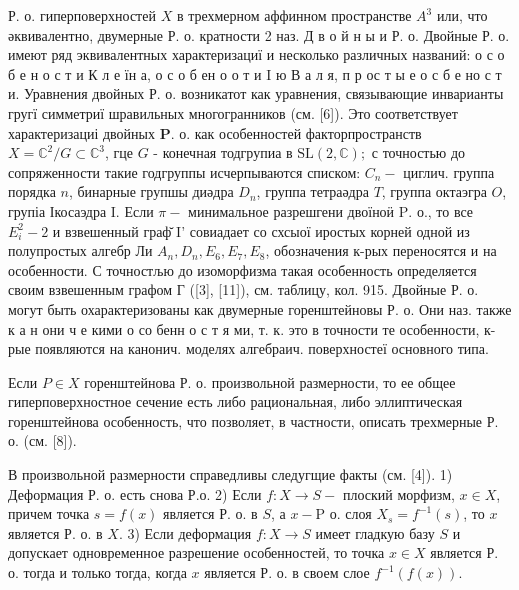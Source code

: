 \documentclass[10pt]{article}
\begin{document}
Р. о. гиперповерхностей $X$ в трехмерном аффинном пространстве $A^{3}$ или, что әквивалентно, двумерные Р. о. кратности 2 наз. Д в о й н ы и Р. о. Двойные Р. о. имеют ряд эквивалентных характеризациї и несколько различных названий: о с о б е н о с т и К л е їн а, о с о б ен о о т и I ю В а л я, п р ос т ы е о с б е но с т и. Уравнения двойных Р. о. возникатот как уравнения, связывающие инварианты гругї симметриї шравильных многогранников (см. [6]). Это соответствует характеризациі двойных $\mathbf{P}$. о. как особенностей факторпространств $X=\mathbb{C}^{2} / G \subset \mathbb{C}^{3}$, гце $G$ - конечная тодгрупиа в $\mathrm{SL}(2, \mathbb{C}) ;$ с точностью до сопряженности такие годгруппы исчерпываются списком: $C_{n}-$ циглич. группа порядка $n$, бинарные групшы диәдра $D_{n}$, группа тетраәдра $T$, группа октаэгра $O$, групіа Ікосаэдра I. Если $\pi-$ минимальное разрешгени двоїноӥ $\mathrm{P}$. о., то все $E_{i}^{2}-2$ и взвешенный граф̆ I' совиадает со схсыої иростых корней одной из полупростых алгебр Ли $A_{n}, D_{n}, E_{6}, E_{7}, E_{8}$, обозначения к-рых переносятся и на особенности. С точностљю до изоморфизма такая особенность определяется своим взвешенным графом Г ([3], [11]), см. таблицу, кол. 915. Двойные Р. о. могут быть охарактеризованы как двумерные горенштейновы Р. о. Они наз. также к а н они ч е кими о со бенн о с т я ми, т. к. это в точности те особенности, к-рые появляются на канонич. моделях алгебраич. поверхностеї основного типа.



Если $P \in X$ горенштейнова Р. о. произвольной размерности, то ее общее гиперповерхностное сечение есть либо рациональная, либо эллиптическая горенштейнова особенность, что позволяет, в частности, описать трехмерные Р. о. (см. [8]).



В произвольной размерности справедливы следугщие факты (см. [4]). 1) Деформация Р. о. есть снова Р.о. 2) Если $f: X \rightarrow S-$ плоский морфизм, $x \in X$, причем точка $s=f(x)$ является Р. о. в $S$, а $x-\mathrm{P}$ о. слоя $X_{s}=f^{-1}(s)$, то $x$ является Р. о. в $X$. 3) Если деформация $f: X \rightarrow S$ имеет гладкую базу $S$ и допускает одновременное разрешение особенностей, то точка $x \in X$ является Р. о. тогда и только тогда, когда $x$ является Р. о. в своем слое $f^{-1}(f(x))$.
\end{document}
